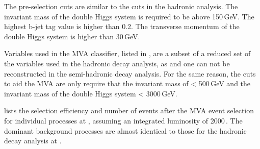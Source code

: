 The pre-selection cuts are similar to the cuts in the hadronic analysis. The invariant mass of the double Higgs system is required to be above 150\,GeV. The highest b-jet tag value is higher than 0.2. The transverse momentum of the double Higgs system is higher than 30\,GeV.

Variables used in the MVA classifier, listed in  ,  are a subset of a reduced set of the variables  used in the hadronic decay analysis, as \HWW and one \PW can not be reconstructed in the semi-hadronic decay analysis. For the same reason, the cuts to aid the MVA are only require that the invariant mass of \Hbb < 500\,GeV and the invariant mass of the double Higgs system < 3000\,GeV.



 lists the  selection efficiency and number of events after the MVA event selection for individual processes at , assuming an integrated luminosity of 2000\,.  The dominant background processes are almost identical to those for the hadronic decay analysis  at .

